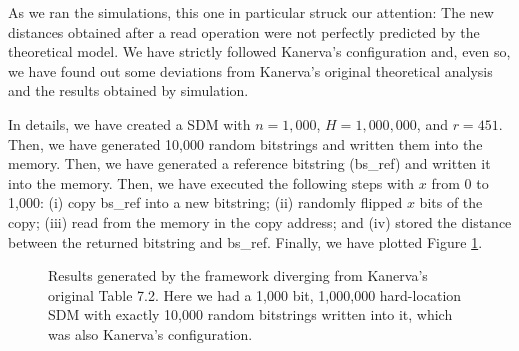 As we ran the simulations, this one in particular struck our attention: The new distances obtained after a read operation were not perfectly predicted by the theoretical model. We have strictly followed Kanerva's configuration and, even so, we have found out some deviations from Kanerva's original theoretical analysis and the results obtained by simulation.

In details, we have created a SDM with $n=1,000$, $H=1,000,000$, and $r=451$. Then, we have generated 10,000 random bitstrings and written them into the memory. Then, we have generated a reference bitstring (bs\_ref) and written it into the memory. Then, we have executed the following steps with $x$ from 0 to 1,000: (i) copy bs\_ref into a new bitstring; (ii) randomly flipped $x$ bits of the copy; (iii) read from the memory in the copy address; and (iv) stored the distance between the returned bitstring and bs\_ref. Finally, we have plotted Figure \ref{fig:sdm-10000w-table-7-2}.

\begin{figure}[h]
\centering
{}

\caption{Results generated by the framework diverging from Kanerva's original Table 7.2. Here we had a 1,000 bit, 1,000,000 hard-location SDM with exactly 10,000 random bitstrings written into it, which was also Kanerva's configuration.
\label{fig:sdm-10000w-table-7-2}}
\end{figure}

